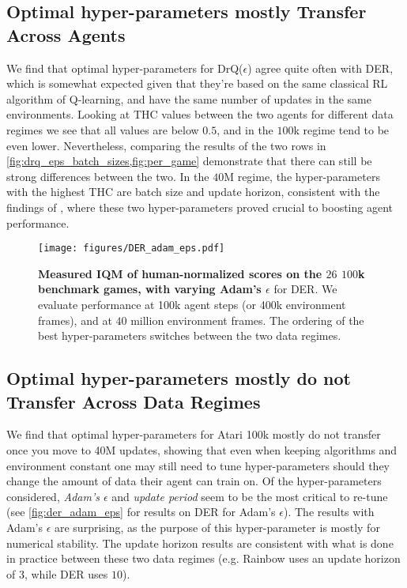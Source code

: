 \subsection{Optimal hyper-parameters mostly Transfer Across Agents}
\label{sec:acrossAlgorithms}
We find that optimal hyper-parameters for DrQ($\epsilon$) agree quite often with DER, which is somewhat expected given that they're based on the same classical RL algorithm of Q-learning, and have the same number of updates in the same environments. Looking at THC values between the two agents for different data regimes we see that all values are below $0.5$, and in the $100$k regime tend to be even lower. Nevertheless, comparing the results of the two rows in \cref{fig:drq_eps_batch_sizes,fig:per_game} demonstrate that there can still be strong differences between the two. In the $40$M regime, the hyper-parameters with the highest THC are batch size and update horizon, consistent with the findings of \cite{obandoceron2023small}, where these two hyper-parameters proved crucial to boosting agent performance.


\begin{figure}[!t]
    \centering
  \texttt{[image: figures/DER\_adam\_eps.pdf]}%
    \caption{
     \textbf{Measured IQM of human-normalized scores on the $26$ $100$k benchmark games, with varying Adam's $\epsilon$} for DER. We evaluate performance at 100k agent steps (or 400k environment frames), and at $40$ million environment frames. The ordering of the best hyper-parameters switches between the two data regimes.
    }
    \label{fig:der_adam_eps}
\end{figure}

\subsection{Optimal hyper-parameters mostly do not Transfer Across Data Regimes}
\label{sec:acrossData}
We find that optimal hyper-parameters for Atari 100k mostly do not transfer once you move to 40M updates, showing that even when keeping algorithms and environment constant one may still need to tune hyper-parameters should they change the amount of data their agent can train on. Of the hyper-parameters considered, {\em Adam's $\epsilon$} and {\em update period} seem to be the most critical to re-tune (see \autoref{fig:der_adam_eps} for results on DER for Adam's $\epsilon$). The results with Adam's $\epsilon$ are surprising, as the purpose of this hyper-parameter is mostly for numerical stability. The update horizon results are consistent with what is done in practice between these two data regimes (e.g. Rainbow uses an update horizon of $3$, while DER uses $10$).

